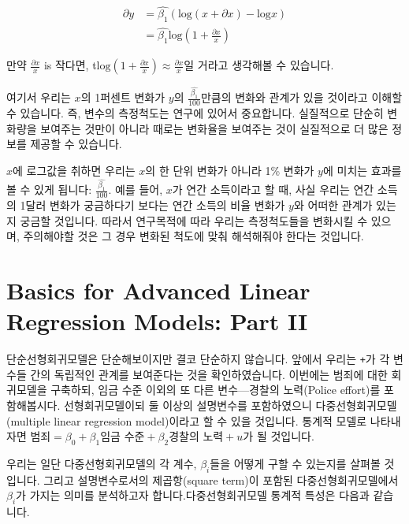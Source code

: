 \documentclass[
]{book}
\begin{document}
\begin{equation*}
\begin{aligned}
  \partial y&= \hat{\beta_1}(\text{log}(x + \partial x) - \text{log}x)\\
   &= \hat{\beta_1}\text{log}(1 + \frac{\partial x}{x})
\end{aligned}
\end{equation*}

만약 \(\frac{\partial x}{x}\) is 작다면, t\(\text{log}(1 + \frac{\partial x}{x}) \approx \frac{\partial x}{x}\)일 거라고 생각해볼 수 있습니다.

여기서 우리는 \(x\)의 1퍼센트 변화가 \(y\)의 \(\frac{\hat{\beta_1}}{100}\)만큼의 변화와 관계가 있을 것이라고 이해할 수 있습니다. 즉, 변수의 측정척도는 연구에 있어서 중요합니다. 실질적으로 단순히 변화량을 보여주는 것만이 아니라 때로는 변화율을 보여주는 것이 실질적으로 더 많은 정보를 제공할 수 있습니다.

\(x\)에 로그값을 취하면 우리는 \(x\)의 한 단위 변화가 아니라 1\% 변화가 \(y\)에 미치는 효과를 볼 수 있게 됩니다: \(\frac{\hat{\beta_1}}{100}\). 예를 들어, \(x\)가 연간 소득이라고 할 때, 사실 우리는 연간 소득의 1달러 변화가 궁금하다기 보다는 연간 소득의 비율 변화가 \(y\)와 어떠한 관계가 있는지 궁금할 것입니다. 따라서 연구목적에 따라 우리는 측정척도들을 변화시킬 수 있으며, 주의해야할 것은 그 경우 변화된 척도에 맞춰 해석해줘야 한다는 것입니다.

\hypertarget{basics-for-advanced-linear-regression-models-part-ii}{%
\chapter{Basics for Advanced Linear Regression Models: Part II}\label{basics-for-advanced-linear-regression-models-part-ii}}

단순선형회귀모델은 단순해보이지만 결코 단순하지 않습니다. 앞에서 우리는 \texttt{+}가 각 변수들 간의 독립적인 관계를 보여준다는 것을 확인하였습니다. 이번에는 범죄에 대한 회귀모델을 구축하되, 임금 수준 이외의 또 다른 변수---경찰의 노력(Police effort)를 포함해봅시다. 선형회귀모델이되 둘 이상의 설명변수를 포함하였으니 다중선형회귀모델(multiple linear regression model)이라고 할 수 있을 것입니다. 통계적 모델로 나타내자면 \(\text{범죄} = \beta_0 + \beta_1\text{임금 수준} + \beta_2\text{경찰의 노력} + u\)가 될 것입니다.

우리는 일단 다중선형회귀모델의 각 계수, \(\beta_i\)들을 어떻게 구할 수 있는지를 살펴볼 것입니다. 그리고 설명변수로서의 제곱항(square term)이 포함된 다중선형회귀모델에서 \(\beta_i\)가 가지는 의미를 분석하고자 합니다.다중선형회귀모델 통계적 특성은 다음과 같습니다.
\end{document}
